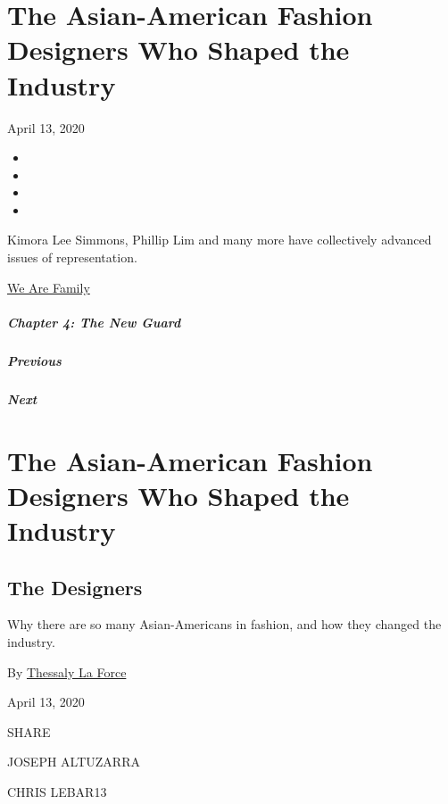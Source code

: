 \hypertarget{the-asian-american-fashion-designers-who-shaped-the-industry}{%
\section{The Asian-American Fashion Designers Who Shaped the
Industry}\label{the-asian-american-fashion-designers-who-shaped-the-industry}}

April 13, 2020

\begin{itemize}
\item
\item
\item
\item
\end{itemize}

Kimora Lee Simmons, Phillip Lim and many more have collectively advanced
issues of representation.

\href{https://www.nytimes.com/interactive/2020/04/13/t-magazine/culture-issue-2020.html}{We
Are Family}

\hypertarget{chapter-4-the-new-guard}{%
\subparagraph{Chapter 4: The New Guard}\label{chapter-4-the-new-guard}}

\hypertarget{previous}{%
\subparagraph{Previous}\label{previous}}

\hypertarget{next}{%
\subparagraph{Next}\label{next}}

\hypertarget{the-asian-american-fashion-designers-who-shaped-the-industry-1}{%
\section{The Asian-American Fashion Designers Who Shaped the
Industry}\label{the-asian-american-fashion-designers-who-shaped-the-industry-1}}

\hypertarget{the-designers}{%
\subsection{The Designers}\label{the-designers}}

Why there are so many Asian-Americans in fashion, and how they changed
the industry.

By \href{https://www.nytimes.com/by/thessaly-la-force}{Thessaly La
Force}

April 13, 2020

SHARE

JOSEPH ALTUZARRA

CHRIS LEBAR13

